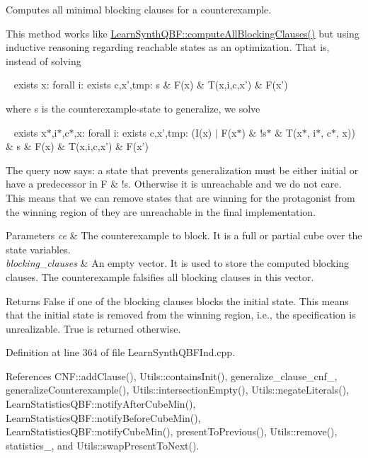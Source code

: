 Computes all minimal blocking clauses for a counterexample. 

This method works like \hyperlink{classLearnSynthQBF_affa7b4583cc17d01f4c82fd57e763e1f}{Learn\-Synth\-Q\-B\-F\-::compute\-All\-Blocking\-Clauses()} but using inductive reasoning regarding reachable states as an optimization. That is, instead of solving \par
 ~ exists x\-: forall i\-: exists c,x',tmp\-: s \& F(x) \& T(x,i,c,x') \& F(x') \par
 where s is the counterexample-\/state to generalize, we solve \par
 ~ exists x$\ast$,i$\ast$,c$\ast$,x\-: forall i\-: exists c,x',tmp\-: (I(x) $\vert$ F(x$\ast$) \& !s$\ast$ \& T(x$\ast$, i$\ast$, c$\ast$, x)) \& s \& F(x) \& T(x,i,c,x') \& F(x') \par
 The query now says\-: a state that prevents generalization must be either initial or have a predecessor in F \& !s. Otherwise it is unreachable and we do not care. This means that we can remove states that are winning for the protagonist from the winning region of they are unreachable in the final implementation.


\begin{DoxyParams}{Parameters}
{\em ce} & The counterexample to block. It is a full or partial cube over the state variables. \\
\hline
{\em blocking\-\_\-clauses} & An empty vector. It is used to store the computed blocking clauses. The counterexample falsifies all blocking clauses in this vector. \\
\hline
\end{DoxyParams}
\begin{DoxyReturn}{Returns}
False if one of the blocking clauses blocks the initial state. This means that the initial state is removed from the winning region, i.\-e., the specification is unrealizable. True is returned otherwise. 
\end{DoxyReturn}


Definition at line 364 of file Learn\-Synth\-Q\-B\-F\-Ind.\-cpp.



References C\-N\-F\-::add\-Clause(), Utils\-::contains\-Init(), generalize\-\_\-clause\-\_\-cnf\-\_\-, generalize\-Counterexample(), Utils\-::intersection\-Empty(), Utils\-::negate\-Literals(), Learn\-Statistics\-Q\-B\-F\-::notify\-After\-Cube\-Min(), Learn\-Statistics\-Q\-B\-F\-::notify\-Before\-Cube\-Min(), Learn\-Statistics\-Q\-B\-F\-::notify\-Cube\-Min(), present\-To\-Previous(), Utils\-::remove(), statistics\-\_\-, and Utils\-::swap\-Present\-To\-Next().




